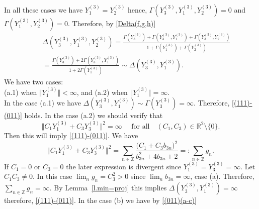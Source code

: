\documentclass[preprint,12pt]{elsarticle}
\numberwithin{equation}{section}
\begin{document}
\begin{pf}
In all these cases we have $Y_1^{(3)}=Y_2^{(3)}$ hence,
$\Gamma(Y_3^{(3)},Y_1^{(3)},Y_2^{(3)})=0$ and 
$\Gamma(Y_1^{(3)},Y_2^{(3)})=0$. Therefore, 
by \eqref{Delta(f,g,h)}
%
\begin{eqnarray}
\nonumber
 &&
 \Delta(Y_3^{(3)},Y_1^{(3)},Y_2^{(3)})=
 \frac{\Gamma(Y_3^{(3)})+
 \Gamma(Y_3^{(3)},Y_1^{(3)})+
 \Gamma(Y_3^{(3)},Y_2^{(3)})
 }{1+\Gamma(Y_1^{(3)})+\Gamma(Y_2^{(3)})} \\
 \label{(011)(a-c)}
 &&
 =\frac{\Gamma(Y_3^{(3)})+2 \Gamma(Y_3^{(3)},Y_1^{(3)})}{1+2\Gamma(Y_1^{(3)})}
 \sim  
 \Delta(Y_3^{(3)},Y_1^{(3)}).
\end{eqnarray}
%
We have two cases:\\
(a.1) when $\Vert Y_1^{(3)}\Vert <\infty$, and (a.2) when 
$\Vert Y_1^{(3)}\Vert =\infty$.\\
In the case (a.1) we have 
$\Delta(Y_3^{(3)},Y_1^{(3)})\sim \Gamma(Y_3^{(3)})=\infty$.
Therefore,  \eqref{(111)-(011)} holds.
%
In the case (a.2) we should verify that
\begin{equation}
 \label{(111)(c)}
\Vert C_1Y_1^{(3)}+C_3Y_3^{(3)}\Vert^2=\infty\quad\text{ for all} \quad
(C_1,C_3)\in {\mathbb R}^2\setminus\{0\}.
\end{equation}
Then this will imply \eqref{(111)-(011)}. We have
\begin{equation*}
\Vert C_1Y_1^{(3)}+C_3Y_3^{(3)}\Vert^2=
\sum_{n\in \mathbb Z}\frac{\big(C_1+C_3b_{3n}\big)^2}{b^2_{3n}+4b_{3n}+2}=:\sum_{n\in \mathbb Z}g_n.
\end{equation*}
If $C_1=0$ or $C_3=0$ the later expression is divergent since $Y_1^{(3)}=Y_3^{(3)}=\infty$. Let $C_1C_3\!\not=\!0$. In this case $\lim_ng_n=C_3^2>0$ since $\lim_nb_{3n}=\infty$, case (a). Therefore, $\sum_{n\in \mathbb Z}g_n=\infty$. 
By Lemma~\ref{l.min=proj}  this implies 
$\Delta(Y_3^{(3)},Y_1^{(3)})=\infty$ therefore,
\eqref{(111)-(011)}.
In the case (b) we have by \eqref{(011)(a-c)}


\end{pf}
\end{document}
